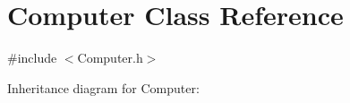 \hypertarget{classComputer}{}\section{Computer Class Reference}
\label{classComputer}


{\ttfamily \#include $<$Computer.\+h$>$}



Inheritance diagram for Computer\+:
